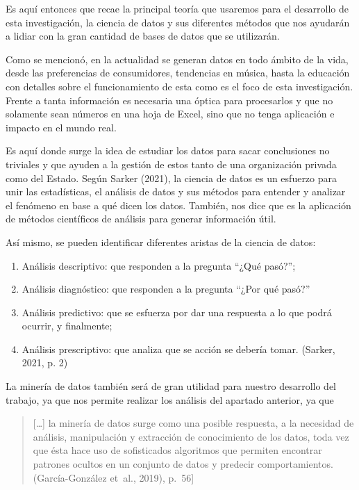 \documentclass[
  12pt,
  letterpaper,
]{article}
\begin{document}
Es aquí entonces que recae la principal teoría que usaremos para el desarrollo de esta investigación, la ciencia de datos y sus diferentes métodos que nos ayudarán a lidiar con la gran cantidad de bases de datos que se utilizarán.

Como se mencionó, en la actualidad se generan datos en todo ámbito de la vida, desde las preferencias de consumidores, tendencias en música, hasta la educación con detalles sobre el funcionamiento de esta como es el foco de esta investigación.
Frente a tanta información es necesaria una óptica para procesarlos y que no solamente sean números en una hoja de Excel, sino que no tenga aplicación e impacto en el mundo real.

Es aquí donde surge la idea de estudiar los datos para sacar conclusiones no triviales y que ayuden a la gestión de estos tanto de una organización privada como del Estado.
Según Sarker (2021), la ciencia de datos es un esfuerzo para unir las estadísticas, el análisis de datos y sus métodos para entender y analizar el fenómeno en base a qué dicen los datos.
También, nos dice que es la aplicación de métodos científicos de análisis para generar información útil.

Así mismo, se pueden identificar diferentes aristas de la ciencia de datos:

\begin{enumerate}
\def\labelenumi{\arabic{enumi}.}
\item
  Análisis descriptivo: que responden a la pregunta ``¿Qué pasó?'';
\item
  Análisis diagnóstico: que responden a la pregunta ``¿Por qué pasó?''
\item
  Análisis predictivo: que se esfuerza por dar una respuesta a lo que podrá ocurrir, y finalmente;
\item
  Análisis prescriptivo: que analiza que se acción se debería tomar.
  (Sarker, 2021, p. 2)
\end{enumerate}

La minería de datos también será de gran utilidad para nuestro desarrollo del trabajo, ya que nos permite realizar los análisis del apartado anterior, ya que

\begin{quote}
{[}\ldots{]} la minería de datos surge como una posible respuesta, a la necesidad de análisis, manipulación y extracción de conocimiento de los datos, toda vez que ésta hace uso de sofisticados algoritmos que permiten encontrar patrones ocultos en un conjunto de datos y predecir comportamientos.
(García-González et~al., 2019), p.~56{]}
\end{quote}
\end{document}
